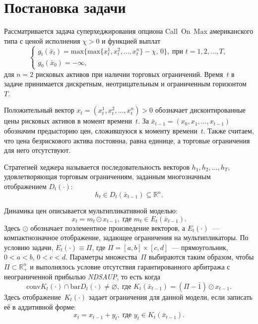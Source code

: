 \documentclass[a4paper, 12pt]{article}
\theoremstyle{def}
\theoremstyle{th}
\theoremstyle{rem}
\begin{document}
    
    \tableofcontents
    \newpage

    \section{Постановка задачи}
    Рассматривается задача суперхеджирования опциона Call~On~Max американского типа с ценой исполнения $\chi > 0$ и функцией выплат
    \begin{equation}\label{eq:call_on_max}
        \begin{cases}
        g_t(\bar x_t) = \mathrm{max}\{\mathrm{max}\{x^1_t,x^2_t,\ldots,x^n_t\} - \chi,\,0\},\;\mbox{при $t=1,2,\ldots,T,$}\\
        g_0(\bar x_0) = -\infty,
        \end{cases}
    \end{equation}
    для $n = 2$ рисковых активов при наличии торговых ограничений. Время~$t$ в задаче принимается дискретным, неотрицательным и ограниченным горизонтом~$T$.

    Положительный вектор $x_t=(x^1_t,x^2_t,\ldots,x^n_t) > 0$ обозначает дисконтированные цены рисковых активов в момент времени~$t$. За $\bar x_{t-1} = (x_0,x_1,\ldots,x_{t-1})$ обозначим предысторию цен, сложившуюся к моменту времени~$t$. Также считаем, что цена безрискового актива постоянна, равна единице, а торговые ограничения для него отсутствуют.

    Стратегией хеджера называется последовательность векторов $h_1,h_2, \ldots, h_T$, удовлетворяющая торговым ограничениям, заданным многозначным отображением $D_t(\cdot)$:
    \begin{equation}
        h_t \in D_t(\bar x_{t-1}) \subseteq \mathbb{R}^n.
    \end{equation}

    Динамика цен описывается мультипликативной моделью:
    \begin{equation}
        x_t = m_t \odot x_{t-1},\;\mbox{где $m_t \in E_t(\bar x_{t-1})$.}
    \end{equation}
    Здесь $\odot$ обозначает поэлементное произведение векторов, а $E_t(\cdot)$~--- компактнозначное отображение, задающее ограничения на мультипликаторы. По условию задачи, $E_t(\cdot) \equiv \Pi$, где $\Pi = [a,b]\times[c,d]$~--- прямоугольник, $0<a<b$, $0<c<d$. Параметры множества~$\Pi$ выбираются таким образом, чтобы $\Pi \subset \mathbb{R}^n_+$ и выполнялось условие отсутствия гарантированного арбитража с неограниченной прибылью \textit{NDSAUP}, то есть когда
    \begin{equation}\label{eq:no_arbitrage}
        \mathrm{conv}K_t(\cdot) \cap \mathrm{bar}D_t(\cdot) \neq \varnothing,\;\mbox{где $K_t(\bar x_{t-1}) = (\Pi - \bar 1) \odot x_{t-1}$}.
    \end{equation}
    Здесь отображение~$K_t(\cdot)$ задает ограничения для данной модели, если записать её в аддитивной форме:
    \begin{equation}
        x_t = x_{t-1} + y_t,\;\mbox{где $y_t \in K_t(\bar x_{t-1})$.}
    \end{equation}
\end{document}
